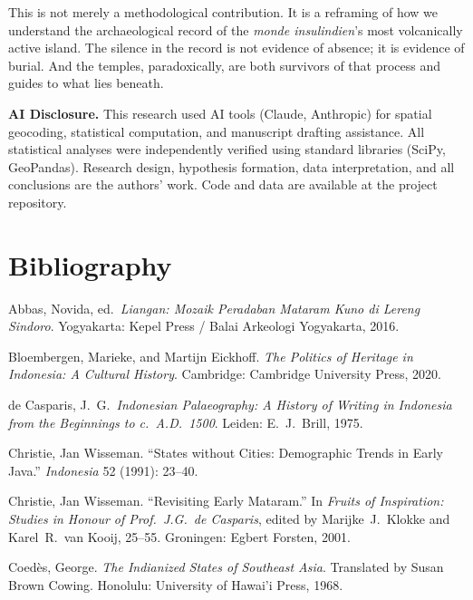 \documentclass[12pt,a4paper]{article}
\begin{document}
This is not merely a methodological contribution.
It is a reframing of how we understand the archaeological record of the \emph{monde insulindien}'s most volcanically active island.
The silence in the record is not evidence of absence; it is evidence of burial.
And the temples, paradoxically, are both survivors of that process and guides to what lies beneath.

\vspace{1em}
\noindent\textbf{AI Disclosure.} This research used AI tools (Claude, Anthropic) for spatial geocoding, statistical computation, and manuscript drafting assistance. All statistical analyses were independently verified using standard libraries (SciPy, GeoPandas). Research design, hypothesis formation, data interpretation, and all conclusions are the authors' work. Code and data are available at the project repository.


\section*{Bibliography}

\noindent Abbas, Novida, ed.\ \emph{Liangan: Mozaik Peradaban Mataram Kuno di Lereng Sindoro}. Yogyakarta: Kepel Press / Balai Arkeologi Yogyakarta, 2016.

\vspace{0.5em}
\noindent Bloembergen, Marieke, and Martijn Eickhoff. \emph{The Politics of Heritage in Indonesia: A Cultural History}. Cambridge: Cambridge University Press, 2020.

\vspace{0.5em}
\noindent de Casparis, J.~G.\ \emph{Indonesian Palaeography: A History of Writing in Indonesia from the Beginnings to c.~A.D.~1500}. Leiden: E.~J.\ Brill, 1975.

\vspace{0.5em}
\noindent Christie, Jan Wisseman. ``States without Cities: Demographic Trends in Early Java.'' \emph{Indonesia} 52 (1991): 23--40.

\vspace{0.5em}
\noindent Christie, Jan Wisseman. ``Revisiting Early Mataram.'' In \emph{Fruits of Inspiration: Studies in Honour of Prof.~J.G.\ de Casparis}, edited by Marijke~J.\ Klokke and Karel~R.\ van Kooij, 25--55. Groningen: Egbert Forsten, 2001.

\vspace{0.5em}
\noindent Coed\`{e}s, George. \emph{The Indianized States of Southeast Asia}. Translated by Susan Brown Cowing. Honolulu: University of Hawai'i Press, 1968.
\end{document}
